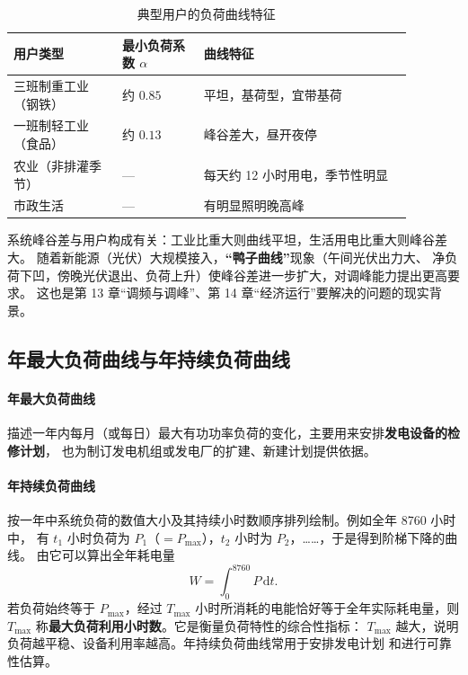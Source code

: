 \begin{table}[htbp]
  \centering
  \caption{典型用户的负荷曲线特征}
  \small
  \begin{tabular}{@{}p{0.24\linewidth}p{0.18\linewidth}p{0.46\linewidth}@{}}
    \toprule
    用户类型 & 最小负荷系数 $\alpha$ & 曲线特征 \\
    \midrule
    三班制重工业（钢铁） & 约 $0.85$ & 平坦，基荷型，宜带基荷 \\
    一班制轻工业（食品） & 约 $0.13$ & 峰谷差大，昼开夜停 \\
    农业（非排灌季节） & — & 每天约 12 小时用电，季节性明显 \\
    市政生活 & — & 有明显照明晚高峰 \\
    \bottomrule
  \end{tabular}
\end{table}

系统峰谷差与用户构成有关：工业比重大则曲线平坦，生活用电比重大则峰谷差大。
随着新能源（光伏）大规模接入，\textbf{“鸭子曲线”}现象（午间光伏出力大、
净负荷下凹，傍晚光伏退出、负荷上升）使峰谷差进一步扩大，对调峰能力提出更高要求。
这也是第 13 章“调频与调峰”、第 14 章“经济运行”要解决的问题的现实背景。

\subsection{年最大负荷曲线与年持续负荷曲线}

\paragraph{年最大负荷曲线}
描述一年内每月（或每日）最大有功功率负荷的变化，主要用来安排\textbf{发电设备的检修计划}，
也为制订发电机组或发电厂的扩建、新建计划提供依据。

\paragraph{年持续负荷曲线}
按一年中系统负荷的数值大小及其持续小时数顺序排列绘制。例如全年 8760 小时中，
有 $t_1$ 小时负荷为 $P_1$（$=P_{\max}$），$t_2$ 小时为 $P_2$，……，于是得到阶梯下降的曲线。
由它可以算出全年耗电量
\begin{equation}
  W=\int_{0}^{8760}P\,\mathrm{d}t .
\end{equation}
若负荷始终等于 $P_{\max}$，经过 $T_{\max}$ 小时所消耗的电能恰好等于全年实际耗电量，则
$T_{\max}$ 称\textbf{最大负荷利用小时数}。它是衡量负荷特性的综合性指标：
$T_{\max}$ 越大，说明负荷越平稳、设备利用率越高。年持续负荷曲线常用于安排发电计划
和进行可靠性估算。

